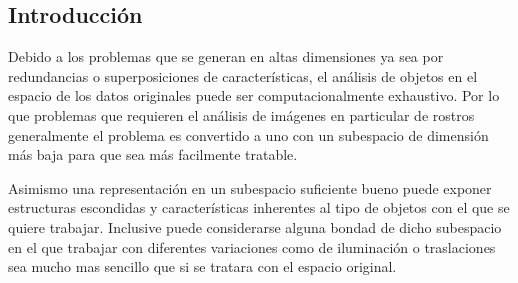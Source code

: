 \documentclass[a0,portrait]{a0poster}
\begin{document}
\vspace{1cm} %


\begin{multicols}{3} %


\color{Navy} %

\begin{abstract}
Un rostro puede ser representado conceptualmente como una conjunto de partes distribuídas de manera esparcida: ojos, nariz, boca, etc. Los humanos tenemos la habilidad de encontrar patrones en las caras lo que nos permite diferenciar entre el rostro de un hombre y el de una mujer. El siguiente reporte presenta los resultados de aplicar NMF(non-negative matrix factorization), LNMF(Local NMF) y PCA a diversas imágenes de rostros de hombres y mujeres con el fin de generar un clasificador de género comparando los 3 métodos para conocer su efectividad en dicha tarea.
\end{abstract}
\color{Black} %
\section*{Introducci\'on}
Debido a los problemas que se generan en altas dimensiones ya sea por redundancias o superposiciones de características, el análisis de objetos en el espacio de los datos originales puede ser computacionalmente exhaustivo. Por lo que problemas que requieren el análisis de imágenes en particular de rostros generalmente el problema es convertido a uno con un subespacio de dimensión más baja para que sea más facilmente tratable.\newline

Asimismo una representación en un subespacio suficiente bueno puede exponer estructuras escondidas y características inherentes al tipo de objetos con el que se quiere trabajar. Inclusive puede considerarse alguna bondad de dicho subespacio en el que trabajar con diferentes variaciones como de iluminación o traslaciones sea mucho mas sencillo que si se tratara con el espacio original.\newline


\end{multicols}
\end{document}
